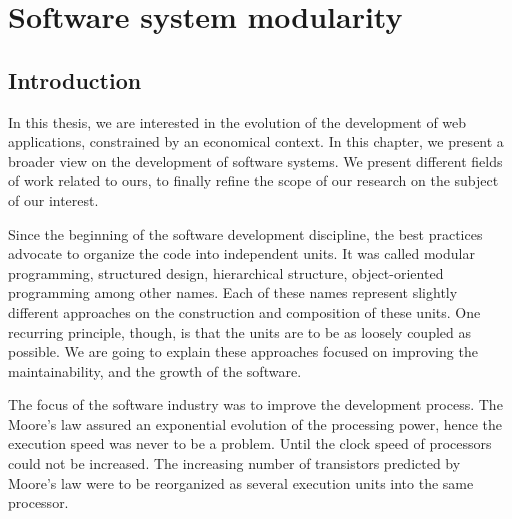 \chapter{Software system modularity} \label{chapter3}
\minitoc
\eject

\section{Introduction}

In this thesis, we are interested in the evolution of the development of web applications, constrained by an economical context.
In this chapter, we present a broader view on the development of software systems.
We present different fields of work related to ours, to finally refine the scope of our research on the subject of our interest.


Since the beginning of the software development discipline, the best practices advocate to organize the code into independent units.
It was called modular programming\cite{Parnas1972}, structured design\cite{Stevens1974}, hierarchical structure\cite{Dijkstra1968}, object-oriented programming among other names.
Each of these names represent slightly different approaches on the construction and composition of these units.
One recurring principle, though, is that the units are to be as loosely coupled as possible.
We are going to explain these approaches focused on improving the maintainability, and the growth of the software.




The focus of the software industry was to improve the development process.
The Moore's law\cite{Moore1965} assured an exponential evolution of the processing power, hence the execution speed was never to be a problem.
Until the clock speed of processors could not be increased.
The increasing number of transistors predicted by Moore's law were to be reorganized as several execution units into the same processor.


